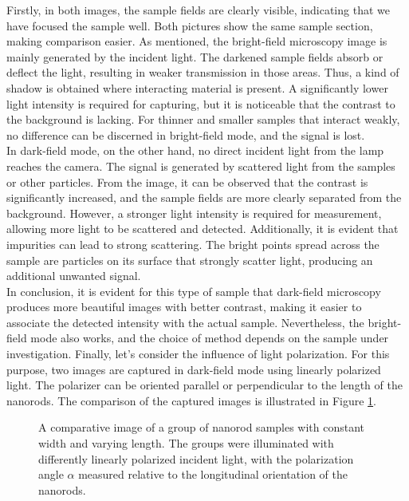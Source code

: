 Firstly, in both images, the sample fields are clearly visible, indicating that we have 
focused the sample well. 
Both pictures show the same sample section, making comparison easier. 
As mentioned, the bright-field microscopy image is mainly generated by the incident light. 
The darkened sample fields absorb or deflect the light, resulting in weaker transmission 
in those areas. 
Thus, a kind of shadow is obtained where interacting material is present. 
A significantly lower light intensity is required for capturing, 
but it is noticeable that the contrast to the background is lacking.
For thinner and smaller samples that interact weakly, no difference can be discerned 
in bright-field mode, and the signal is lost. \\ 
In dark-field mode, on the other hand, no direct incident light from the lamp reaches the camera. 
The signal is generated by scattered light from the samples or other particles. 
From the image, it can be observed that the contrast is significantly increased, 
and the sample fields are more clearly separated from the background. 
However, a stronger light intensity is required for measurement, allowing more light 
to be scattered and detected. 
Additionally, it is evident that impurities can lead to strong scattering. 
The bright points spread across the sample are particles on its surface that strongly scatter light, 
producing an additional unwanted signal. \\
In conclusion, it is evident for this type of sample that dark-field microscopy produces 
more beautiful images with better contrast, making it easier to associate the detected 
intensity with the actual sample. 
Nevertheless, the bright-field mode also works, and the choice of method depends 
on the sample under investigation. \newpage
Finally, let's consider the influence of light polarization. 
For this purpose, two images are captured in dark-field mode using linearly polarized light. 
The polarizer can be oriented parallel or perpendicular to the length of the nanorods. 
The comparison of the captured images is illustrated in Figure \ref{fig:polari}.
\begin{figure}[h!]
    \centering
    \qquad
    \caption{\label{fig:polari}A comparative image of a group of nanorod samples with constant width 
    and varying length. The groups were illuminated with differently linearly polarized incident 
    light, with the polarization angle $\alpha$ measured relative to the longitudinal orientation 
    of the nanorods.}
\end{figure}\FloatBarrier
